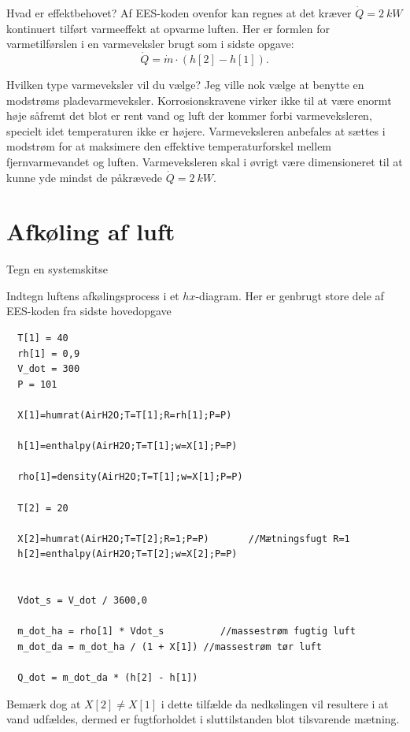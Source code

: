 \documentclass[a4paper]{article}
\begin{document}
 Hvad er effektbehovet?
\bigbreak
Af EES-koden ovenfor kan regnes at det kræver $\dot{Q} = \qty{2}{kW}$ kontinuert tilført varmeeffekt at opvarme luften. Her er formlen for varmetilførslen i en varmeveksler brugt som i sidste opgave:
\[ 
  \dot{Q} = \dot{m} \cdot \left( h[2] - h[1] \right)
.\]


 Hvilken type varmeveksler vil du vælge?
\bigbreak
Jeg ville nok vælge at benytte en modstrøms pladevarmeveksler. Korrosionskravene virker ikke til at være enormt høje såfremt det blot er rent vand og luft der kommer forbi varmeveksleren, specielt idet temperaturen ikke er højere. Varmeveksleren anbefales at sættes i modstrøm for at maksimere den effektive temperaturforskel mellem fjernvarmevandet og luften. Varmeveksleren skal i øvrigt være dimensioneret til at kunne yde mindst de påkrævede $\dot{Q} = \qty{2}{kW}$. 


\section{Afkøling af luft}

 Tegn en systemskitse
\begin{figure}[ht]
  \centering
  \caption{}
  \label{fig:e31}
\end{figure}

 Indtegn luftens afkølingsprocess i et $hx$-diagram.
\bigbreak
Her er genbrugt store dele af EES-koden fra sidste hovedopgave
\begin{verbatim}
  T[1] = 40
  rh[1] = 0,9
  V_dot = 300
  P = 101
   
  X[1]=humrat(AirH2O;T=T[1];R=rh[1];P=P)
   
  h[1]=enthalpy(AirH2O;T=T[1];w=X[1];P=P)
   
  rho[1]=density(AirH2O;T=T[1];w=X[1];P=P)
   
  T[2] = 20
   
  X[2]=humrat(AirH2O;T=T[2];R=1;P=P)       //Mætningsfugt R=1
  h[2]=enthalpy(AirH2O;T=T[2];w=X[2];P=P)
   
   
  Vdot_s = V_dot / 3600,0
   
  m_dot_ha = rho[1] * Vdot_s          //massestrøm fugtig luft
  m_dot_da = m_dot_ha / (1 + X[1]) //massestrøm tør luft
   
  Q_dot = m_dot_da * (h[2] - h[1])
\end{verbatim}
Bemærk dog at $X[2]\neq X[1]$ i dette tilfælde da nedkølingen vil resultere i at vand udfældes, dermed er fugtforholdet i sluttilstanden blot tilsvarende mætning. 
\end{document}

